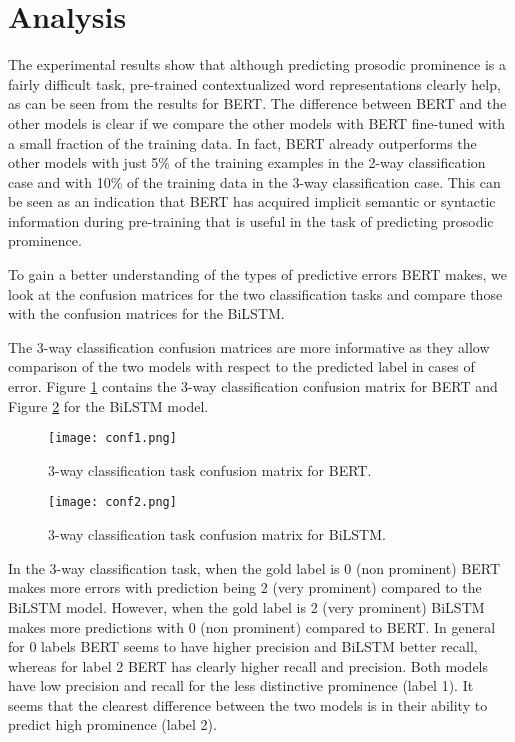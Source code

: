 \documentclass[11pt]{article}
\begin{document}
\section{Analysis}\label{sec:analysis}

The experimental results show that although predicting prosodic prominence is a fairly difficult task, pre-trained contextualized word representations clearly help, as can be seen from the results for BERT. The difference between BERT and the other models is clear if we compare the other models with BERT fine-tuned with a small fraction of the training data. In fact, BERT already outperforms the other models with just 5\% of the training examples in the 2-way classification case and with 10\% of the training data in the 3-way classification case. This can be seen as an indication that BERT has acquired implicit semantic or syntactic information during pre-training that is useful in the task of predicting prosodic prominence.

To gain a better understanding of the types of predictive errors BERT makes, we look at the confusion matrices for the two classification tasks and compare those with the confusion matrices for the BiLSTM.

The 3-way classification confusion matrices are more informative as they allow comparison of the two models with respect to the predicted label in cases of error. Figure \ref{figure:BERTconf_3way} contains the 3-way classification confusion matrix for BERT and Figure \ref{figure:BiLSTMconf_3way} for the BiLSTM model. 



\begin{figure}[h!]
    \centering
    \texttt{[image: conf1.png]}
    \caption{3-way classification task confusion matrix for BERT.}
    \label{figure:BERTconf_3way}
\end{figure}

\begin{figure}[h!]
    \centering
    \texttt{[image: conf2.png]}
    \caption{3-way classification task confusion matrix for BiLSTM.}
    \label{figure:BiLSTMconf_3way}
\end{figure}



In the 3-way classification task, when the gold label is 0 (non prominent) BERT makes more errors with prediction being 2 (very prominent) compared to the BiLSTM model. However, when the gold label is 2 (very prominent) BiLSTM makes more predictions with 0 (non prominent) compared to BERT. In general for 0 labels BERT seems to have higher precision and BiLSTM better recall, whereas for label 2 BERT has clearly higher recall and precision. Both models have low precision and recall for the less distinctive prominence (label 1). It seems that the clearest difference between the two models is in their ability to predict high prominence (label 2). 
\end{document}
